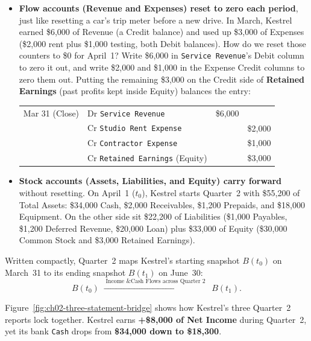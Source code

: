 \begin{itemize}
  \item \textbf{Flow accounts (Revenue and Expenses) reset to zero each period}, just like resetting a car's trip meter before a new drive. In March, Kestrel earned \$6,000 of Revenue (a Credit balance) and used up \$3,000 of Expenses (\$2,000 rent plus \$1,000 testing, both Debit balances). How do we reset those counters to \$0 for April~1? Write \$6,000 in \texttt{Service Revenue}'s Debit column to zero it out, and write \$2,000 and \$1,000 in the Expense Credit columns to zero them out. Putting the remaining \$3,000 on the Credit side of \textbf{Retained Earnings} (past profits kept inside Equity) balances the entry:
  \begin{center}
  \small
  \begin{tabular}{@{}llrr@{}}
  Mar 31 (Close) & Dr \texttt{Service Revenue} & \$6,000 & \\
                 & \quad Cr \texttt{Studio Rent Expense} & & \$2,000 \\
                 & \quad Cr \texttt{Contractor Expense} & & \$1,000 \\
                 & \quad Cr \texttt{Retained Earnings} (Equity) & & \$3,000
  \end{tabular}
  \end{center}
  \item \textbf{Stock accounts (Assets, Liabilities, and Equity) carry forward} without resetting. On April~1 ($t_0$), Kestrel starts Quarter~2 with \$55,200 of Total Assets: \$34,000 Cash, \$2,000 Receivables, \$1,200 Prepaids, and \$18,000 Equipment. On the other side sit \$22,200 of Liabilities (\$1,000 Payables, \$1,200 Deferred Revenue, \$20,000 Loan) plus \$33,000 of Equity (\$30,000 Common Stock and \$3,000 Retained Earnings).
\end{itemize}

Written compactly, Quarter~2 maps Kestrel's starting snapshot $B(t_0)$ on March~31 to its ending snapshot $B(t_1)$ on June~30:
\begin{equation}
  \label{eq:ch02-state-transition}
  B(t_0) \;\xrightarrow{\;\text{Income \& Cash Flows across Quarter 2}\;}\; B(t_1).
\end{equation}

Figure~\ref{fig:ch02-three-statement-bridge} shows how Kestrel's three Quarter~2 reports lock together. Kestrel earns \textbf{+\$8,000 of Net Income} during Quarter~2, yet its bank \texttt{Cash} drops from \textbf{\$34,000 down to \$18,300}.

